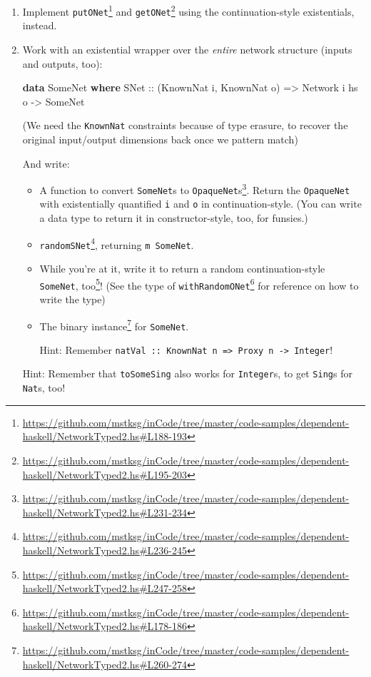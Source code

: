 \documentclass[]{article}
\newenvironment{Shaded}{\begin{snugshade}}{\end{snugshade}}
\newcommand{\DataTypeTok}[1]{\textcolor[rgb]{0.13,0.29,0.53}{#1}}
\newcommand{\KeywordTok}[1]{\textcolor[rgb]{0.13,0.29,0.53}{\textbf{#1}}}
\newcommand{\NormalTok}[1]{#1}
\newcommand{\OtherTok}[1]{\textcolor[rgb]{0.56,0.35,0.01}{#1}}
\renewcommand{\href}[2]{#2\footnote{\url{#1}}}
\begin{document}
\begin{enumerate}
\def\labelenumi{\arabic{enumi}.}
\item
  Implement
  \href{https://github.com/mstksg/inCode/tree/master/code-samples/dependent-haskell/NetworkTyped2.hs\#L188-193}{\texttt{putONet\textquotesingle{}}}
  and
  \href{https://github.com/mstksg/inCode/tree/master/code-samples/dependent-haskell/NetworkTyped2.hs\#L195-203}{\texttt{getONet\textquotesingle{}}}
  using the continuation-style existentials, instead.
\item
  Work with an existential wrapper over the \emph{entire} network structure
  (inputs and outputs, too):

\begin{Shaded}
\begin{Highlighting}[]
\KeywordTok{data} \DataTypeTok{SomeNet} \KeywordTok{where}
    \DataTypeTok{SNet}\OtherTok{ ::}\NormalTok{ (}\DataTypeTok{KnownNat}\NormalTok{ i, }\DataTypeTok{KnownNat}\NormalTok{ o)}
         \OtherTok{=>} \DataTypeTok{Network}\NormalTok{ i hs o}
         \OtherTok{->} \DataTypeTok{SomeNet}
\end{Highlighting}
\end{Shaded}

  (We need the \texttt{KnownNat} constraints because of type erasure, to recover
  the original input/output dimensions back once we pattern match)

  And write:

  \begin{itemize}
  \item
    A function to
    \href{https://github.com/mstksg/inCode/tree/master/code-samples/dependent-haskell/NetworkTyped2.hs\#L231-234}{convert
    \texttt{SomeNet}s to \texttt{OpaqueNet}s}. Return the \texttt{OpaqueNet}
    with existentially quantified \texttt{i} and \texttt{o} in
    continuation-style. (You can write a data type to return it in
    constructor-style, too, for funsies.)
  \item
    \href{https://github.com/mstksg/inCode/tree/master/code-samples/dependent-haskell/NetworkTyped2.hs\#L236-245}{\texttt{randomSNet}},
    returning \texttt{m\ SomeNet}.
  \item
    While you're at it, write it to return
    \href{https://github.com/mstksg/inCode/tree/master/code-samples/dependent-haskell/NetworkTyped2.hs\#L247-258}{a
    random continuation-style \texttt{SomeNet}, too}! (See the type of
    \href{https://github.com/mstksg/inCode/tree/master/code-samples/dependent-haskell/NetworkTyped2.hs\#L178-186}{\texttt{withRandomONet\textquotesingle{}}}
    for reference on how to write the type)
  \item
    The
    \href{https://github.com/mstksg/inCode/tree/master/code-samples/dependent-haskell/NetworkTyped2.hs\#L260-274}{binary
    instance} for \texttt{SomeNet}.

    Hint: Remember
    \texttt{natVal\ ::\ KnownNat\ n\ =\textgreater{}\ Proxy\ n\ -\textgreater{}\ Integer}!
  \end{itemize}

  Hint: Remember that \texttt{toSomeSing} also works for \texttt{Integer}s, to
  get \texttt{Sing}s for \texttt{Nat}s, too!
\end{enumerate}
\end{document}
